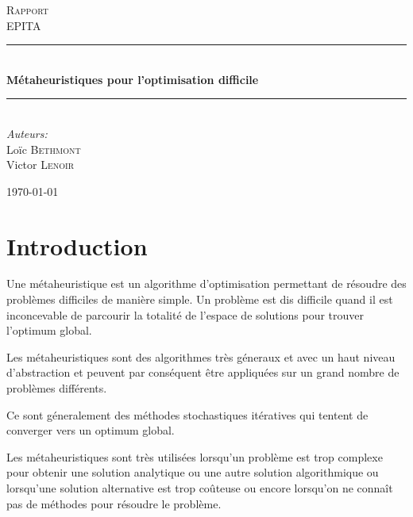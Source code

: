 \documentclass{report}
\newcommand{\HRule}{\rule{\linewidth}{0.5mm}}
\begin{document}
\begin{titlepage}

\begin{center}

\textsc{\LARGE Rapport}\\[1.5cm]

\textsc{\Large EPITA}\\[0.5cm]

\HRule \\[0.4cm]
{ \huge \bfseries Métaheuristiques pour l'optimisation difficile}\\[0.4cm]

\HRule \\[1.5cm]

\large
\emph{Auteurs:}\\
Loïc \textsc{Bethmont}\\
Victor \textsc{Lenoir}\\

\vfill

{\large \today}

\end{center}

\end{titlepage}
\newpage
\tableofcontents
\newpage

\chapter{Introduction}

Une métaheuristique est un algorithme d'optimisation permettant de
résoudre des problèmes difficiles de manière simple.  Un problème est
dis difficile quand il est inconcevable de parcourir la totalité de
l'espace de solutions pour trouver l'optimum global.


Les métaheuristiques sont des algorithmes très géneraux et avec un
haut niveau d'abstraction et peuvent par conséquent être appliquées sur
un grand nombre de problèmes différents.


Ce sont géneralement des méthodes stochastiques itératives qui tentent
de converger vers un optimum global.


Les métaheuristiques sont très utilisées lorsqu'un problème est trop
complexe pour obtenir une solution analytique ou une autre solution
algorithmique ou lorsqu'une solution alternative est trop coûteuse ou
encore lorsqu'on ne connaît pas de méthodes pour résoudre le problème.
\end{document}
